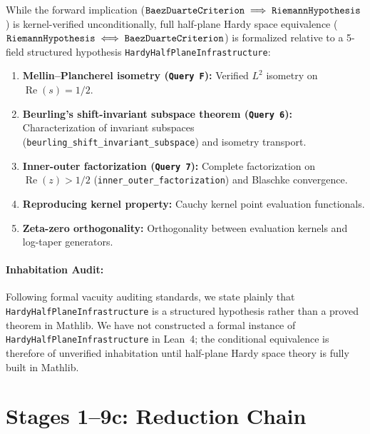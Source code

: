 \documentclass[11pt,a4paper]{article}
\theoremstyle{plain}
\theoremstyle{definition}
\theoremstyle{remark}
\DeclareMathOperator{\RePart}{Re}
\renewcommand{\Re}{\RePart}
\begin{document}
While the forward implication ($\text{\texttt{BaezDuarteCriterion}} \implies \text{\texttt{RiemannHypothesis}}$) is kernel-verified unconditionally, full half-plane Hardy space equivalence ($\text{\texttt{RiemannHypothesis}} \iff \text{\texttt{BaezDuarteCriterion}}$) is formalized relative to a 5-field structured hypothesis \texttt{HardyHalfPlaneInfrastructure}:
\begin{enumerate}[label=\textbf{\arabic*.}]
  \item \textbf{Mellin--Plancherel isometry (\texttt{Query F}):} Verified $L^2$ isometry on $\Re(s) = 1/2$.
  \item \textbf{Beurling's shift-invariant subspace theorem (\texttt{Query 6}):} Characterization of invariant subspaces (\texttt{beurling\_shift\_invariant\_subspace}) and isometry transport.
  \item \textbf{Inner-outer factorization (\texttt{Query 7}):} Complete factorization on $\Re(z) > 1/2$ (\texttt{inner\_outer\_factorization}) and Blaschke convergence.
  \item \textbf{Reproducing kernel property:} Cauchy kernel point evaluation functionals.
  \item \textbf{Zeta-zero orthogonality:} Orthogonality between evaluation kernels and log-taper generators.
\end{enumerate}

\paragraph{Inhabitation Audit:}
Following formal vacuity auditing standards, we state plainly that \texttt{HardyHalfPlaneInfrastructure} is a structured hypothesis rather than a proved theorem in Mathlib. We have not constructed a formal instance of \texttt{HardyHalfPlaneInfrastructure} in Lean~4; the conditional equivalence is therefore of unverified inhabitation until half-plane Hardy space theory is fully built in Mathlib.

\section{Stages 1--9c: Reduction Chain}
\label{sec:stages}
\end{document}
